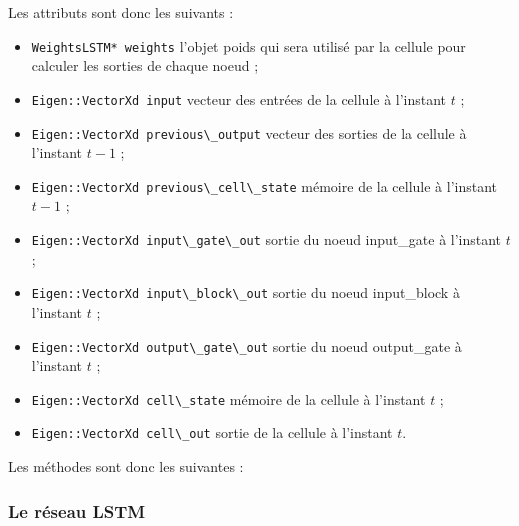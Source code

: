 \bigskip

Les attributs sont donc les suivants :

\begin{itemize}
  \item \verb+WeightsLSTM* weights+ l'objet poids qui sera utilisé par la
    cellule pour calculer les sorties de chaque noeud ;
  \item \verb+Eigen::VectorXd input+ vecteur des entrées de la cellule à
    l'instant $t$ ;
  \item \verb+Eigen::VectorXd previous\_output+ vecteur des sorties de la
    cellule à l'instant $t-1$ ;
  \item \verb+Eigen::VectorXd previous\_cell\_state+ mémoire de la cellule
    à l'instant $t-1$ ;
  \item \verb+Eigen::VectorXd input\_gate\_out+ sortie du noeud input\_gate
    à l'instant $t$ ;
  \item \verb+Eigen::VectorXd input\_block\_out+ sortie du noeud input\_block
    à l'instant $t$ ;
  \item \verb+Eigen::VectorXd output\_gate\_out+ sortie du noeud output\_gate
    à l'instant $t$ ;
  \item \verb+Eigen::VectorXd cell\_state+ mémoire de la cellule à
    l'instant $t$ ;
  \item \verb+Eigen::VectorXd cell\_out+ sortie de la cellule à l'instant $t$.
\end{itemize}

Les méthodes sont donc les suivantes :


\subsubsection{Le réseau LSTM}

